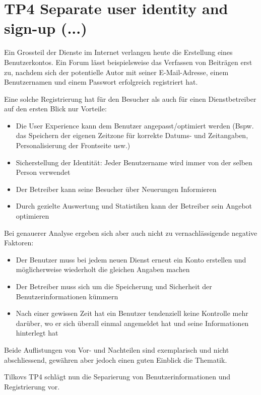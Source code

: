 \section{TP4 Separate user identity and sign-up (...)}
\label{sec:principle-tp4-seperate-user-identity}

Ein Grossteil der Dienste im Internet verlangen heute die Erstellung eines Benutzerkontos. Ein Forum lässt beispielsweise das Verfassen von Beiträgen erst zu, nachdem sich der potentielle Autor mit seiner E-Mail-Adresse, einem Benutzernamen und einem Passwort erfolgreich registriert hat.

Eine solche Registrierung hat für den Besucher als auch für einen Dienstbetreiber auf den ersten Blick nur Vorteile:

\begin{itemize}
	\item Die User Experience kann dem Benutzer angepasst/optimiert werden (Bspw. das Speichern der eigenen Zeitzone für korrekte Datums- und Zeitangaben, Personalisierung der Frontseite usw.)
	\item Sicherstellung der Identität: Jeder Benutzername wird immer von der selben Person verwendet
	\item Der Betreiber kann seine Besucher über Neuerungen Informieren
	\item Durch gezielte Auswertung und Statistiken kann der Betreiber sein Angebot optimieren
\end{itemize}

Bei genauerer Analyse ergeben sich aber auch nicht zu vernachlässigende negative Faktoren:

\begin{itemize}
	\item Der Benutzer muss bei jedem neuen Dienst erneut ein Konto erstellen und möglicherweise wiederholt die gleichen Angaben machen
	\item Der Betreiber muss sich um die Speicherung und Sicherheit der Benutzerinformationen kümmern
	\item Nach einer gewissen Zeit hat ein Benutzer tendenziell keine Kontrolle mehr darüber, wo er sich überall einmal angemeldet hat und seine Informationen hinterlegt hat
\end{itemize}

Beide Auflistungen von Vor- und Nachteilen sind exemplarisch und nicht abschliessend, gewähren aber jedoch einen guten Einblick die Thematik.

Tilkovs TP4 schlägt nun die Separierung von Benutzerinformationen und Registrierung vor.

